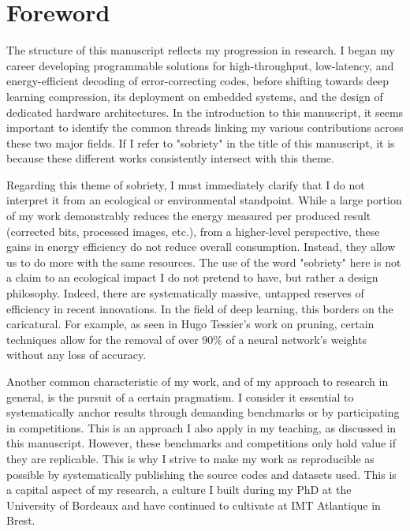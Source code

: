 \documentclass[11pt]{report}
\begin{document}
\dominitoc %

\tableofcontents
\vspace{1.5cm}



\chapter{Foreword}

The structure of this manuscript reflects my progression in research. I began my career developing programmable solutions for high-throughput, low-latency, and energy-efficient decoding of error-correcting codes, before shifting towards deep learning compression, its deployment on embedded systems, and the design of dedicated hardware architectures. In the introduction to this manuscript, it seems important to identify the common threads linking my various contributions across these two major fields. If I refer to "sobriety" in the title of this manuscript, it is because these different works consistently intersect with this theme.

Regarding this theme of sobriety, I must immediately clarify that I do not interpret it from an ecological or environmental standpoint. While a large portion of my work demonstrably reduces the energy measured per produced result (corrected bits, processed images, etc.), from a higher-level perspective, these gains in energy efficiency do not reduce overall consumption. Instead, they allow us to do more with the same resources. The use of the word "sobriety" here is not a claim to an ecological impact I do not pretend to have, but rather a design philosophy. Indeed, there are systematically massive, untapped reserves of efficiency in recent innovations. In the field of deep learning, this borders on the caricatural. For example, as seen in Hugo Tessier's work on pruning, certain techniques allow for the removal of over 90\% of a neural network's weights without any loss of accuracy.

Another common characteristic of my work, and of my approach to research in general, is the pursuit of a certain pragmatism. I consider it essential to systematically anchor results through demanding benchmarks or by participating in competitions. This is an approach I also apply in my teaching, as discussed in this manuscript. However, these benchmarks and competitions only hold value if they are replicable. This is why I strive to make my work as reproducible as possible by systematically publishing the source codes and datasets used. This is a capital aspect of my research, a culture I built during my PhD at the University of Bordeaux and have continued to cultivate at IMT Atlantique in Brest.
\end{document}
